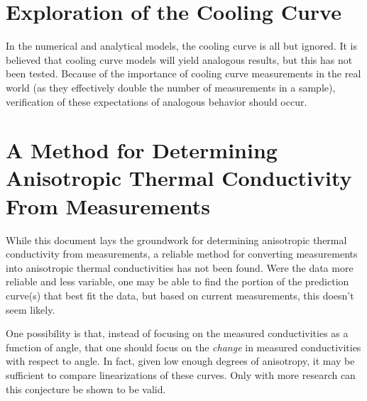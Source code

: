 \section{Exploration of the Cooling Curve}

In the numerical and analytical models, the cooling curve is all but ignored. It
is believed that cooling curve models will yield analogous results, but this has
not been tested. Because of the importance of cooling curve measurements in the
real world (as they effectively double the number of measurements in a sample),
verification of these expectations of analogous behavior should occur.

\section{A Method for Determining Anisotropic Thermal Conductivity From Measurements}

While this document lays the groundwork for determining anisotropic thermal
conductivity from measurements, a reliable method for converting measurements
into anisotropic thermal conductivities has not been found. Were the data
more reliable and less variable, one may be able to find the portion of the
prediction curve(s) that best fit the data, but based on current measurements,
this doesn't seem likely.

One possibility is that, instead of focusing on the measured conductivities as a
function of angle, that one should focus on the \emph{change} in measured
conductivities with respect to angle. In fact, given low enough degrees of
anisotropy, it may be sufficient to compare linearizations of these curves. Only
with more research can this conjecture be shown to be valid.
